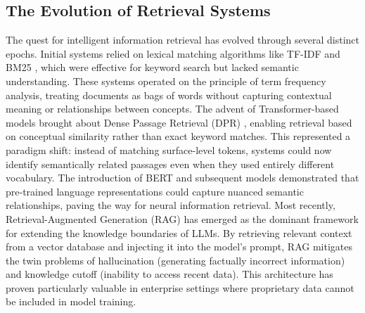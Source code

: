 \documentclass[conference]{IEEEtran}
\begin{document}
\subsection{The Evolution of Retrieval Systems}
The quest for intelligent information retrieval has evolved through several distinct epochs. Initial systems relied on lexical matching algorithms like TF-IDF \cite{salton1988term} and BM25 \cite{robertson2009probabilistic}, which were effective for keyword search but lacked semantic understanding. These systems operated on the principle of term frequency analysis, treating documents as bags of words without capturing contextual meaning or relationships between concepts. The advent of Transformer-based models \cite{vaswani2017attention} brought about Dense Passage Retrieval (DPR) \cite{karpukhin2020dense}, enabling retrieval based on conceptual similarity rather than exact keyword matches. This represented a paradigm shift: instead of matching surface-level tokens, systems could now identify semantically related passages even when they used entirely different vocabulary. The introduction of BERT \cite{devlin2018bert} and subsequent models demonstrated that pre-trained language representations could capture nuanced semantic relationships, paving the way for neural information retrieval. Most recently, Retrieval-Augmented Generation (RAG) \cite{lewis2020retrieval} has emerged as the dominant framework for extending the knowledge boundaries of LLMs. By retrieving relevant context from a vector database and injecting it into the model's prompt, RAG mitigates the twin problems of hallucination (generating factually incorrect information) and knowledge cutoff (inability to access recent data). This architecture has proven particularly valuable in enterprise settings where proprietary data cannot be included in model training.
\end{document}
